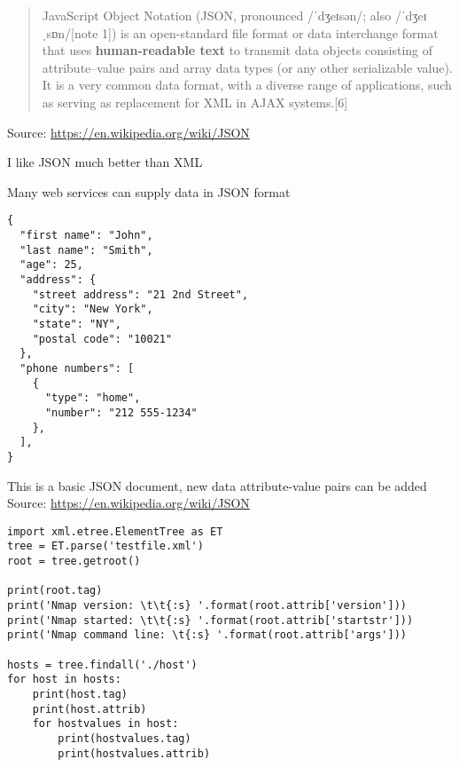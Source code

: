 \documentclass[Screen16to9,17pt]{foils}
\begin{document}

\begin{quote}
JavaScript Object Notation (JSON, pronounced /ˈdʒeɪsən/; also /ˈdʒeɪˌsɒn/[note 1]) is an open-standard file format or data interchange format that uses {\bf human-readable text} to transmit data objects consisting of attribute–value pairs and array data types (or any other serializable value). It is a very common data format, with a diverse range of applications, such as serving as replacement for XML in AJAX systems.[6]
\end{quote}
Source: \url{https://en.wikipedia.org/wiki/JSON}

\begin{list2}
\item I like JSON much better than XML
\item Many web services can supply data in JSON format
\end{list2}


\begin{verbatim}
{
  "first name": "John",
  "last name": "Smith",
  "age": 25,
  "address": {
    "street address": "21 2nd Street",
    "city": "New York",
    "state": "NY",
    "postal code": "10021"
  },
  "phone numbers": [
    {
      "type": "home",
      "number": "212 555-1234"
    },
  ],
}
\end{verbatim}

\begin{list2}
\item This is a basic JSON document, new data attribute-value pairs can be added\\
Source: \url{https://en.wikipedia.org/wiki/JSON}
\end{list2}




\begin{verbatim}
import xml.etree.ElementTree as ET
tree = ET.parse('testfile.xml')
root = tree.getroot()

print(root.tag)
print('Nmap version: \t\t{:s} '.format(root.attrib['version']))
print('Nmap started: \t\t{:s} '.format(root.attrib['startstr']))
print('Nmap command line: \t{:s} '.format(root.attrib['args']))

hosts = tree.findall('./host')
for host in hosts:
    print(host.tag)
    print(host.attrib)
    for hostvalues in host:
        print(hostvalues.tag)
        print(hostvalues.attrib)
\end{verbatim}
\end{document}
